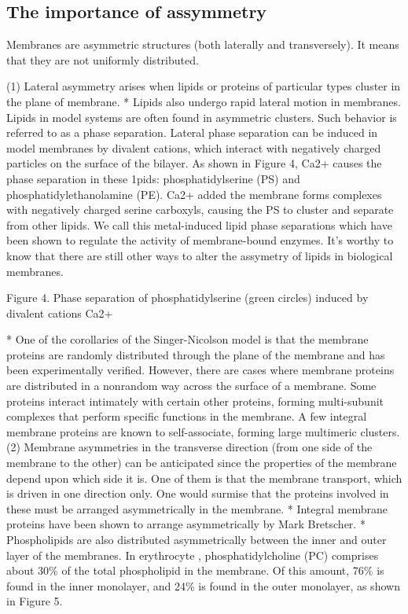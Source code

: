 \subsection{The importance of assymmetry}
\label{sec:import-assymm}


Membranes are asymmetric structures (both laterally and transversely). It means
that they are not uniformly distributed.

(1) Lateral asymmetry arises when lipids or proteins of particular types cluster
in the plane of membrane.
* Lipids also undergo rapid lateral motion in membranes. Lipids in model systems
are often found in asymmetric clusters. Such behavior is referred to as a phase
separation. Lateral phase separation can be induced in model membranes by
divalent cations, which interact with negatively charged particles on the
surface of the bilayer. As shown in Figure 4, Ca2+ causes the phase separation
in these 1pids: phosphatidylserine (PS) and phosphatidylethanolamine (PE). Ca2+
added the membrane forms complexes with negatively charged serine carboxyls,
causing the PS to cluster and separate from other lipids. We call this
metal-induced lipid phase separations which have been shown to regulate the
activity of membrane-bound enzymes. It's worthy to know that there are still
other ways to alter the assymetry of lipids in biological membranes.

Figure 4. Phase separation of phosphatidylserine (green circles) induced by
divalent cations Ca2+

* One of the corollaries of the Singer-Nicolson model is that the membrane
proteins are randomly distributed through the plane of the membrane and has been
experimentally verified. However, there are cases where membrane proteins are
distributed in a nonrandom way across the surface of a membrane. Some proteins
interact intimately with certain other proteins, forming multi-subunit complexes
that perform specific functions in the membrane. A few integral membrane
proteins are known to self-associate, forming large multimeric clusters.
(2) Membrane asymmetries in the transverse direction (from one side of the
membrane to the other) can be anticipated since the properties of the membrane
depend upon which side it is. One of them is that the membrane transport, which
is driven in one direction only. One would surmise that the proteins involved in
these must be arranged asymmetrically in the membrane.
* Integral membrane proteins have been shown to arrange asymmetrically by Mark
Bretscher.
* Phospholipids are also distributed asymmetrically between the inner and outer
layer of the membranes. In erythrocyte , phosphatidylcholine (PC) comprises
about 30\% of the total phospholipid in the membrane. Of this amount, 76\% is
found in the inner monolayer, and 24\% is found in the outer monolayer, as shown
in Figure 5.

